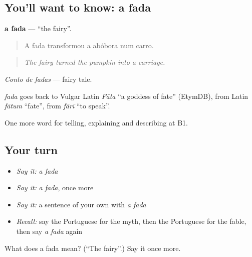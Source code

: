 \subsection*{You'll want to know: a fada}
\textbf{a fada} — \textquotedblleft{}the fairy\textquotedblright{}.

\begin{quote}
A fada transformou a abóbora num carro.
\end{quote}

\begin{quote}
\emph{The fairy turned the pumpkin into a carriage.}
\end{quote}

\emph{Conto de fadas} — fairy tale.

\begin{cousinweb}
\emph{fada} goes back to Vulgar Latin \emph{Fāta} \textquotedblleft{}a goddess of fate\textquotedblright{} (EtymDB), from Latin \emph{fātum} \textquotedblleft{}fate\textquotedblright{}, from \emph{fārī} \textquotedblleft{}to speak\textquotedblright{}.
\end{cousinweb}

\begin{grammarlens}[title={What you've built}]
One more word for telling, explaining and describing at B1.
\end{grammarlens}

\subsection*{Your turn}
\begin{itemize}
\raggedright
  \item \emph{Say it:} \emph{a fada}
  \item \emph{Say it:} \emph{a fada}, once more
  \item \emph{Say it:} a sentence of your own with \emph{a fada}
  \item \emph{Recall:} say the Portuguese for the myth, then the Portuguese for the fable, then say \emph{a fada} again
\end{itemize}

\begin{tcolorbox}[breakable,colback=teal!4,colframe=teal!35!black,title={Before you move on}]
What does a fada mean? (\textquotedblleft{}The fairy\textquotedblright{}.) Say it once more.
\end{tcolorbox}
